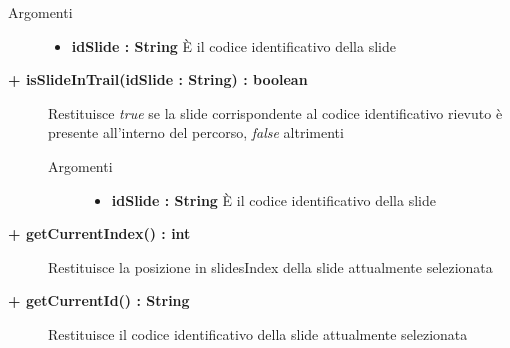 \begin{description}
\begin{description}
		\begin{description}
			\item[Argomenti] \hfill
				\begin{itemize}
				
					\item \textbf{idSlide : String	} \hfill
					È il codice identificativo della slide
					
				\end{itemize}
			
		\end{description}
			
	\end{description}
	
	\begin{description}
		\item[\textbf{\color{blue}+ isSlideInTrail(idSlide : String) : boolean			}] \hfill
			Restituisce \textit{true} se la slide corrispondente al codice identificativo rievuto è presente all'interno del percorso, \textit{false} altrimenti
			
		\begin{description}
			\item[Argomenti] \hfill
				\begin{itemize}
				
					\item \textbf{idSlide : String	} \hfill
					È il codice identificativo della slide
					
				\end{itemize}
			
		\end{description}
			
	\end{description}
	
	\begin{description}
		\item[\textbf{\color{blue}+ getCurrentIndex() : int			}] \hfill
			Restituisce la posizione in slidesIndex della slide attualmente selezionata
			
	\end{description}
	
	\begin{description}
		\item[\textbf{\color{blue}+ getCurrentId() : String			}] \hfill
			Restituisce il codice identificativo della slide attualmente selezionata
			

\end{description}
\end{description}
